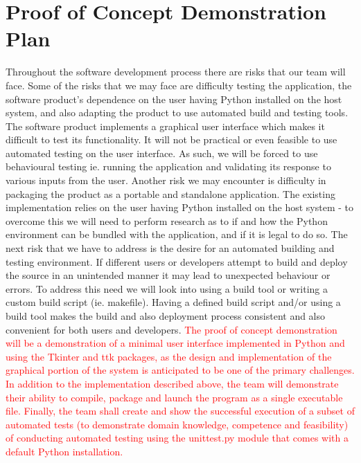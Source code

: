 \documentclass{article}
\begin{document}
\section{Proof of Concept Demonstration Plan}

\indent Throughout the software development process there are risks that our
team will face. Some of the risks that we may face are difficulty testing the
application, the software product's dependence on the user having Python
installed on the host system, and also adapting the product to use automated
build and testing tools.
\newline \indent The software product implements a graphical user
interface which makes it difficult to test its functionality. It will not be
practical or even feasible to use automated testing on the user interface. As
such, we will be forced to use behavioural testing ie. running the application
and validating its response to various inputs from the user.
\newline \indent Another risk we may encounter is difficulty in packaging the
product as a portable and standalone application. The existing implementation
relies on the user having Python installed on the host system - to overcome
this we will need to perform research as to if and how the Python environment
can be bundled with the application, and if it is legal to do so.
\newline \indent The next risk that we have to address is the desire for an
automated building and testing environment. If different users or developers
attempt to build and deploy the source in an unintended manner it may lead to
unexpected behaviour or errors. To address this need we will look into using a
build tool or writing a custom build script (ie. makefile). Having a defined
build script and/or using a build tool makes the build and also deployment
process consistent and also convenient for both users and developers. \newline
\indent \textcolor{red}{The proof of concept demonstration will be a
demonstration of a minimal user interface implemented in Python and using 
the Tkinter and ttk packages, as the design and implementation of the graphical
portion of the system is anticipated to be one of the primary challenges. In
addition to the implementation described above, the team will demonstrate their
ability to compile, package and launch the program as a single executable file.
Finally, the team shall create and show the successful execution of a subset of
automated tests (to demonstrate domain knowledge, competence and feasibility)
of conducting automated testing using the unittest.py module that comes with a
default Python installation.}
\end{document}

